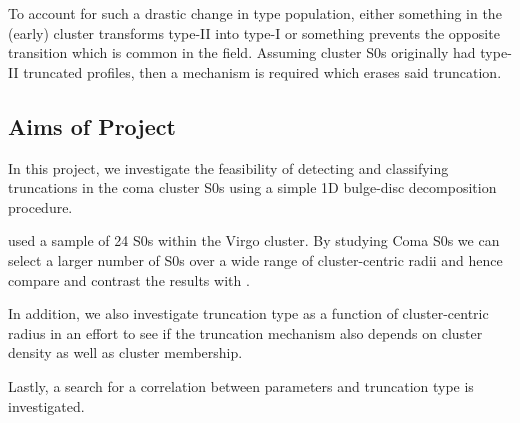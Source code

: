To account for such a drastic change in type population, either something in the (early) cluster transforms type-II into type-I or something prevents the opposite transition which is common in the field. Assuming cluster S0s originally had type-II truncated profiles, then a mechanism is required which erases said truncation.

\subsection{Aims of Project}
In this project, we investigate the feasibility of detecting and classifying truncations in the coma cluster S0s using a simple 1D bulge-disc decomposition procedure. 

\citet{erwin_strong_2012} used a sample of 24 S0s within the Virgo cluster. By studying Coma S0s we can select a larger number of S0s over a wide range of cluster-centric radii and hence compare and contrast the results with \citet{erwin_strong_2012}. 

In addition, we also investigate truncation type as a function of cluster-centric radius in an effort to see if the truncation mechanism also depends on cluster density as well as cluster membership.

Lastly, a search for a correlation between \sersic parameters and truncation type is investigated.

